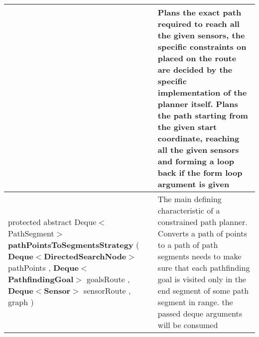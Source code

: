 {\begin{tabularx}{\linewidth}{m{}|m{}}
\begin{raggedleft}
\end{raggedleft} &
 Plans the exact path required to reach all the given sensors, the specific constraints on placed on the route are decided\newline%
 by the specific implementation of the planner itself.\newline%
 Plans the path starting from the given start coordinate, reaching all the given sensors and forming a loop back if the form loop argument is given\\ \hline 
\begin{raggedleft}protected abstract Deque$<$PathSegment$>$ \textbf{pathPointsToSegmentsStrategy }(\newline \hfill 
\hspace*{ 5pt} \textbf{Deque$<$DirectedSearchNode$>$} pathPoints , \newline
 \hspace*{ 5pt} \textbf{Deque$<$PathfindingGoal$>$} goalsRoute , \newline
 \hspace*{ 5pt} \textbf{Deque$<$Sensor$>$} sensorRoute , \newline
 \hspace*{ 5pt} \textbf{\hyperref[tab:ConstrainedTreeGraph]{\color{blue}{ConstrainedTreeGraph}}} graph  )
\end{raggedleft} &
 The main defining characteristic of a constrained path planner. Converts a path of points to a path of path segments\newline%
 needs to make sure that each pathfinding goal is visited only in the end segment of some path segment in range.\newline%
 the passed deque arguments will be consumed\\\end{tabularx}
}
